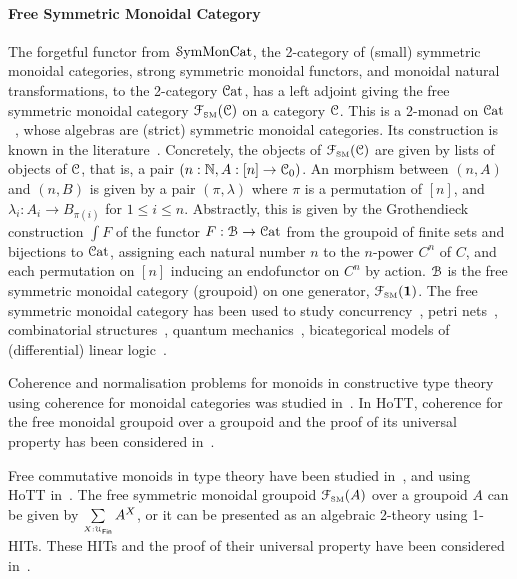 \paragraph{Free Symmetric Monoidal Category} The forgetful functor from $\SymMonCat$, the 2-category of (small)
symmetric monoidal categories, strong symmetric monoidal functors, and monoidal natural transformations, to the
2-category $\CatCat$, has a left adjoint giving the free symmetric monoidal category $\FSM[\CCat{C}]$ on a category
$\CCat{C}$. This is a 2-monad on $\CatCat$~\cite{blackwellTwodimensionalMonadTheory1989}, whose algebras are (strict)
symmetric monoidal categories. Its construction is known in the literature~\cite{abramskyAbstractScalarsLoops2005}.
Concretely, the objects of $\FSM[\CCat{C}]$ are given by lists of objects of $\CCat{C}$, that is, a pair $(n:\Nat, A:[n]
\to \CCat{C}_{0})$. An morphism between $(n,A)$ and $(n,B)$ is given by a pair $(\pi,\lambda)$ where $\pi$ is a
permutation of $[n]$, and $\lambda_{i} : A_{i} \to B_{\pi(i)}$ for $1 \leq i \leq n$. Abstractly, this is given by the
Grothendieck construction $\int F$ of the functor $F : \BFin \to \CatCat$ from the groupoid of finite sets and
bijections to $\CatCat$, assigning each natural number $n$ to the $n$-power $C^{n}$ of $C$, and each permutation on
$[n]$ inducing an endofunctor on $C^{n}$ by action. $\BFin$ is the free symmetric monoidal category (groupoid) on one
generator, $\FSM[\unit]$. The free symmetric monoidal category has been used to study
concurrency~\cite{hylandSymmetricMonoidalSketches2004}, petri nets~\cite{baezCategoriesNets2021}, combinatorial
structures~\cite{fioreCartesianClosedBicategory2008}, quantum mechanics~\cite{abramskyAbstractScalarsLoops2005},
bicategorical models of (differential) linear logic~\cite{melliesTemplateGamesDifferential2019}. 

Coherence and normalisation problems for monoids in constructive type theory using coherence for monoidal categories was
studied in~\cite{beylinExtractingProofCoherence1996}. In HoTT, coherence for the free monoidal groupoid over a groupoid
and the proof of its universal property has been considered in~\cite{piceghelloCoherenceMonoidalGroupoids2020}. 

Free commutative monoids in type theory have been studied in~\cite{gylterudMultisetsTypeTheory2020}, and using HoTT
in~\cite{choudhuryFinitemultisetConstructionHoTT2019}. The free symmetric monoidal groupoid $\FSM[A]$ over a groupoid
$A$ can be given by $\dsum{X:\UFin}{A^{X}}$, or it can be presented as an algebraic 2-theory using 1-HITs. These HITs
and the proof of their universal property have been considered
in~\cite*{piceghelloCoherenceSymmetricMonoidal2019,choudhuryFinitemultisetConstructionHoTT2019}.

